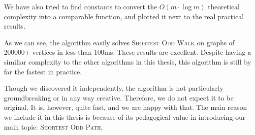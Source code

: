 We have also tried to find constants to convert the $O(m \cdot \log m)$ theoretical complexity into a comparable function, and plotted it next to the real practical results.

\begin{center}
        
\end{center}

As we can see, the algorithm easily solves \textsc{Shortest Odd Walk} on graphs of 200000+ vertices in less than 100ms. These results are excellent. Despite having a similiar complexity to the other algorithms in this thesis, this algorithm is still by far the fastest in practice.

Though we discovered it independently, the algorithm is not particularly groundbreaking or in any way creative. Therefore, we do not expect it to be original. It is, however, quite fast, and we are happy with that. The main reason we include it in this thesis is because of its pedagogical value in introducing our main topic: \textsc{Shortest Odd Path}. 
